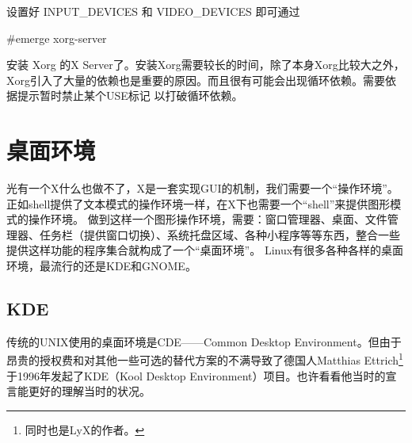 设置好  INPUT\_DEVICES 和 VIDEO\_DEVICES 即可通过

\begin{code}
\#emerge xorg-server
\end{code}

安装 Xorg 的X Server了。安装Xorg需要较长的时间，除了本身Xorg比较大之外，Xorg引入了大量的依赖也是重要的原因。而且很有可能会出现循环依赖。需要依据提示暂时禁止某个USE标记
以打破循环依赖。

\section{桌面环境}

光有一个X什么也做不了，X是一套实现GUI的机制，我们需要一个“操作环境”。正如shell提供了文本模式的操作环境一样，在X下也需要一个“shell”来提供图形模式的操作环境。
做到这样一个图形操作环境，需要：窗口管理器、桌面、文件管理器、任务栏（提供窗口切换）、系统托盘区域、各种小程序等等东西，整合一些提供这样功能的程序集合就构成了一个“桌面环境”。
Linux有很多各种各样的桌面环境，最流行的还是KDE和GNOME。

\subsection{KDE}

传统的UNIX使用的桌面环境是CDE——Common Desktop Environment。但由于昂贵的授权费和对其他一些可选的替代方案的不满导致了德国人Matthias Ettrich\footnote{同时也是LyX的作者。}于1996年发起了KDE（Kool Desktop Environment）项目。也许看看他当时的宣言能更好的理解当时的状况。

